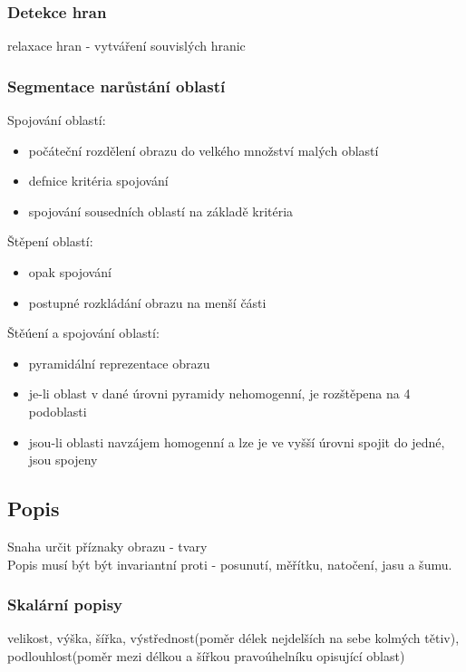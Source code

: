\subsubsection*{Detekce hran}
relaxace hran - vytváření souvislých hranic\\
\newpage
\subsubsection*{Segmentace narůstání oblastí}
Spojování oblastí:
\begin{itemize}
    \item počáteční rozdělení obrazu do velkého množství malých oblastí
    \item defnice kritéria spojování
    \item spojování sousedních oblastí na základě kritéria
\end{itemize}
Štěpení oblastí:
\begin{itemize}
    \item opak spojování
    \item postupné rozkládání obrazu na menší části
\end{itemize}
Štěúení a spojování oblastí:
\begin{itemize}
    \item pyramidální reprezentace obrazu
    \item je-li oblast v dané úrovni pyramidy nehomogenní, je rozštěpena na 4 podoblasti
    \item jsou-li oblasti navzájem homogenní a lze je ve vyšší úrovni spojit do jedné, jsou spojeny
\end{itemize}

\subsection*{Popis}
Snaha určit příznaky obrazu - tvary\\
Popis musí být být invariantní proti - posunutí, měřítku, natočení, jasu a šumu.\\
\subsubsection*{Skalární popisy}
velikost, výška, šířka, výstřednost(poměr délek nejdelších na sebe kolmých tětiv), podlouhlost(poměr mezi délkou a šířkou pravoúhelníku opisující oblast)\\
\newpage
